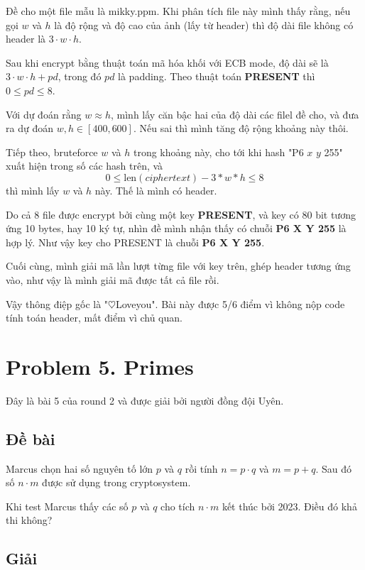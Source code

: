 Đề cho một file mẫu là mikky.ppm. Khi phân tích file này mình thấy rằng, nếu gọi $w$ và $h$ là độ rộng và độ cao của ảnh (lấy từ header) thì độ dài file không có header là $3 \cdot w \cdot h$.

Sau khi encrypt bằng thuật toán mã hóa khối với ECB mode, độ dài sẽ là $3 \cdot w \cdot h + pd$, trong đó $pd$ là padding. Theo thuật toán \textbf{PRESENT} thì $0 \leqslant pd \leqslant 8$.

Với dự đoán rằng $w \approx h$, mình lấy căn bậc hai của độ dài các filel đề cho, và đưa ra dự đoán $w, h \in [400, 600]$. Nếu sai thì mình tăng độ rộng khoảng này thôi.

Tiếp theo, bruteforce $w$ và $h$ trong khoảng này, cho tới khi hash "P6 $x$ $y$ 255" xuất hiện trong số các hash trên, và \[ 0 \leqslant \text{len} (ciphertext) - 3 * w * h \leqslant 8 \] thì mình lấy $w$ và $h$ này. Thế là mình có header.

Do cả 8 file được encrypt bởi cùng một key \textbf{PRESENT}, và key có 80 bit tương ứng 10 bytes, hay 10 ký tự, nhìn đề mình nhận thấy có chuỗi \textbf{P6 X Y 255} là hợp lý. Như vậy key cho PRESENT là chuỗi \textbf{P6 X Y 255}.

Cuối cùng, mình giải mã lần lượt từng file với key trên, ghép header tương ứng vào, như vậy là mình giải mã được tất cả file rồi.

Vậy thông điệp gốc là "$\heartsuit$Loveyou". Bài này được 5/6 điểm vì không nộp code tính toán header, mất điểm vì chủ quan.

\section*{Problem 5. Primes}

Đây là bài 5 của round 2 và được giải bởi người đồng đội Uyên.

\subsection*{Đề bài}

Marcus chọn hai số nguyên tố lớn $p$ và $q$ rồi tính $n = p \cdot q$ và $m = p + q$. Sau đó số $n \cdot m$ được sử dụng trong cryptosystem.

Khi test Marcus thấy các số $p$ và $q$ cho tích $n \cdot m$ kết thúc bởi 2023. Điều đó khả thi không?

\subsection*{Giải}

